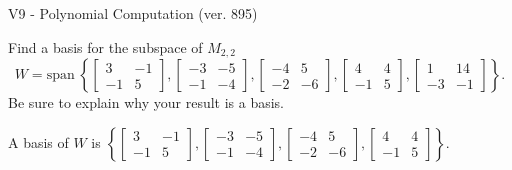 \begin{exercise}
  \begin{exerciseTitle}V9 - Polynomial Computation (ver. 895)\end{exerciseTitle}
  \begin{exerciseStatement}
    Find a basis for the subspace of \(M_{2,2}\) 
\[W=\mathrm{span}\ \left\{\left[\begin{array}{cc}
3 & -1 \\
-1 & 5
\end{array}\right] , \left[\begin{array}{cc}
-3 & -5 \\
-1 & -4
\end{array}\right] , \left[\begin{array}{cc}
-4 & 5 \\
-2 & -6
\end{array}\right] , \left[\begin{array}{cc}
4 & 4 \\
-1 & 5
\end{array}\right] , \left[\begin{array}{cc}
1 & 14 \\
-3 & -1
\end{array}\right]\right\}.\]
 Be sure to explain why your result is a basis.


  \end{exerciseStatement}
  \begin{exerciseAnswer}
   A basis of \(W\) is  \(\left\{\left[\begin{array}{cc}
3 & -1 \\
-1 & 5
\end{array}\right] , \left[\begin{array}{cc}
-3 & -5 \\
-1 & -4
\end{array}\right] , \left[\begin{array}{cc}
-4 & 5 \\
-2 & -6
\end{array}\right] , \left[\begin{array}{cc}
4 & 4 \\
-1 & 5
\end{array}\right]\right\}\).
  


  \end{exerciseAnswer}
\end{exercise}